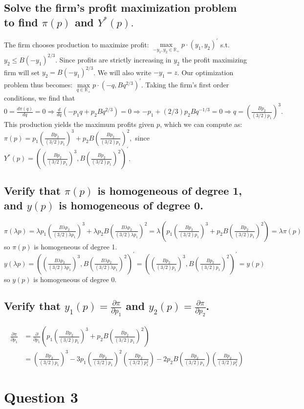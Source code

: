 \documentclass[11pt]{article} %
\begin{document}
\subsection{Solve the firm's profit maximization problem to find $\pi (p)$ and $Y^{*}(p).$}
The firm chooses production to maximize profit: $\max\limits_{-y_1,y_2 \in \mathbb{R}_{+}} p \cdot (y_1,y_2)^{'}$ s.t. $y_2 \leq B(-y_1)^{2/3}$. Since profits are strictly increasing in $y_2$ the profit maximizing firm will set $y_2 =  B(-y_1)^{2/3}$. We will also write $-y_1 = z$. Our optimization problem thus becomes: $\max\limits_{q\in\mathbb{R}_{+}} p \cdot (-q, Bq^{2/3})^{'}.$ Taking the firm's first order conditions, we find that $0 = \frac{d \pi(q)}{dq} = 0 \Rightarrow \frac{d }{dq}\left(  -p_1 q + p_2 Bq^{2/3}\right)  = 0 \Rightarrow -p_1 + (2/3)p_2 B q^{-1/3} = 0 \Rightarrow q = \left(\frac{Bp_2}{ (3/2) p_1} \right)^{3}.$ This production yields the maximum profits given $p$, which we can compute as:\\ $\pi(p) = p_1\left(\frac{Bp_2}{ (3/2) p_1} \right)^{3} + p_2 B\left(\frac{Bp_2}{ (3/2) p_1} \right)^{2},$ since $Y^{*}(p) = \left(\left(\frac{Bp_2}{ (3/2) p_1} \right)^{3},B\left(\frac{Bp_2}{ (3/2) p_1} \right)^{2}\right)^{'}$.

\subsection{Verify that $\pi(p)$ is homogeneous of degree 1, and $y(p)$ is homogeneous of degree 0.}
$\pi(\lambda p) = \lambda p_1\left(\frac{B\lambda p_2}{ (3/2) \lambda p_1} \right)^{3} + \lambda p_2 B\left(\frac{B\lambda p_2}{ (3/2) \lambda p_1} \right)^{2} = \lambda (p_1\left(\frac{Bp_2}{ (3/2) p_1} \right)^{3} + p_2 B\left(\frac{Bp_2}{ (3/2) p_1} \right)^{2}) = \lambda \pi(p)$ so $\pi(p)$ is homogeneous of degree 1. \\
$y(\lambda p) = \left(\left(\frac{B \lambda p_2}{ (3/2) \lambda p_1} \right)^{3},B\left(\frac{B\lambda p_2}{ (3/2) \lambda p_1} \right)^{2}\right)^{'} = \left(\left(\frac{Bp_2}{ (3/2) p_1} \right)^{3},B\left(\frac{Bp_2}{ (3/2) p_1} \right)^{2}\right)^{'} = y(p) $ so $y(p)$ is homogeneous of degree 0.

\subsection{Verify that $y_1(p) = \frac{\partial \pi}{\partial p_1}$ and $y_2(p) = \frac{\partial \pi}{\partial p_2}$.}
\begin{align*}
\frac{\partial \pi}{\partial p_1} &= \frac{\partial }{\partial p_1}\left( p_1\left(\frac{Bp_2}{ (3/2) p_1} \right)^{3} + p_2 B\left(\frac{Bp_2}{ (3/2) p_1} \right)^{2}\right) \\
&= \left(\frac{Bp_2}{ (3/2) p_1} \right)^{3} - 3p_1\left(\frac{Bp_2}{ (3/2) p_1} \right)^{2} \left(\frac{Bp_2}{ (3/2)p_{1}^2}\right) - 2p_2 B\left(\frac{Bp_2}{ (3/2) p_1} \right)\left(\frac{Bp_2}{ (3/2) p_{1}^2}\right)
\end{align*}

\section{Question 3}
\end{document}
